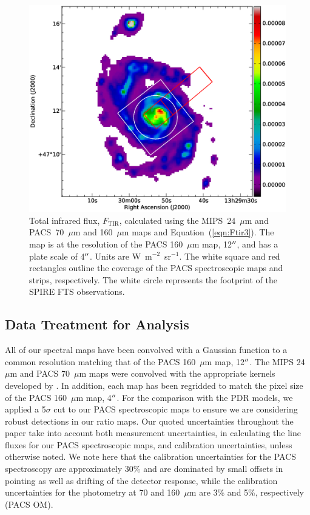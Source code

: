 \begin{figure}[h]
\includegraphics[width=\columnwidth]{ch3/Figure1}
\caption[Total infrared flux of M51]{Total infrared flux, $F_{\mathrm{TIR}}$, calculated using the MIPS~24~$\mu$m and PACS~70~$\mu$m and 160~$\mu$m maps and Equation~(\ref{eqn:Ftir3}).  The map is at the resolution of the PACS 160~$\mu$m map, 12$\mbox{$^{\prime\prime}$}$, and has a plate scale of 4$\mbox{$^{\prime\prime}$}$.  Units are W~m$^{-2}$~sr$^{-1}$.  The white square and red rectangles outline the coverage of the PACS spectroscopic maps and strips, respectively.  The white circle represents the footprint of the SPIRE FTS observations.}
\label{fig:Ltir}
\end{figure}

\subsection{Data Treatment for Analysis}\label{data_treatment}
All of our spectral maps have been convolved with a Gaussian function to a common resolution matching that of the PACS 160~$\mu$m map, 12$\mbox{$^{\prime\prime}$}$.  The MIPS 24~$\mu$m and PACS 70~$\mu$m maps were convolved with the appropriate kernels developed by \citet{2011PASP..123.1218A}.  In addition, each map has been regridded to match the pixel size of the PACS 160~$\mu$m map, 4$\mbox{$^{\prime\prime}$}$.  For the comparison with the PDR models, we applied a 5$\sigma$ cut to our PACS spectroscopic maps to ensure we are considering robust detections in our ratio maps.  Our quoted uncertainties throughout the paper take into account both measurement uncertainties, in calculating the line fluxes for our PACS spectroscopic maps, and calibration uncertainties, unless otherwise noted.  We note here that the calibration uncertainties for the PACS spectroscopy are approximately 30\% and are dominated by small offsets in pointing as well as drifting of the detector response, while the calibration uncertainties for the photometry at 70 and 160~$\mu$m are 3\% and 5\%, respectively (PACS OM).


